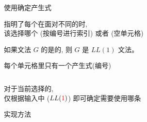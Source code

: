 \begin{frame}{}
  \begin{center}
    {\large 使用确定产生式}
    

    
    指明了每个在面对不同的时, \\[4pt]
    该选择哪个 (按编号进行索引) 或者 (空单元格)
  \end{center}
\end{frame}

\begin{frame}{}
  \begin{center}
    \begin{definition}[$LL(1)$文法]
      如果文法 $G$ 的是的,
      则 $G$ 是 $LL(1)$ 文法。
    \end{definition}

     每个单元格里只有一个产生式(编号) \\[8pt]

    \begin{columns}
        
        
    \end{columns}

    \vspace{0.60cm}
    对于当前选择的, \\[4pt]
    仅根据输入中 ($LL(\textcolor{red}{1})$) 即可确定需要使用哪条
  \end{center}
\end{frame}

\begin{frame}{}
  \begin{center}
    {\large {}实现方法}

    \begin{columns}
        
        
        
    \end{columns}
  \end{center}
\end{frame}

